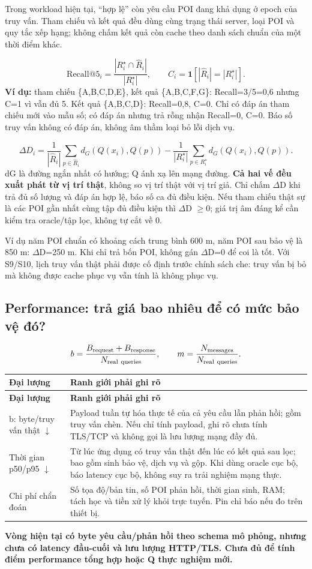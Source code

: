 \documentclass[10pt,a4paper]{article}
\newcommand{\key}[1]{\par\smallskip\noindent\colorbox{pale}{\parbox{\dimexpr\linewidth-2\fboxsep}{\textbf{#1}}}\par\smallskip}
\begin{document}
Trong workload hiện tại, “hợp lệ” còn yêu cầu POI đang khả dụng ở epoch của truy vấn. Tham chiếu và kết quả đều dùng cùng trạng thái server, loại POI và quy tắc xếp hạng; không chấm kết quả còn cache theo danh sách chuẩn của một thời điểm khác.

\[
\mathrm{Recall@5}_i=\frac{|R_i^\star\cap\widehat R_i|}{|R_i^\star|},\qquad C_i=\mathbf1[|\widehat R_i|=|R_i^\star|].
\]
\textbf{Ví dụ:} tham chiếu \{A,B,C,D,E\}, kết quả \{A,B,C,F,G\}: Recall=3/5=0,6 nhưng C=1 vì vẫn đủ 5. Kết quả \{A,B,C,D\}: Recall=0,8, C=0. Chỉ có đáp án tham chiếu mới vào mẫu số; có đáp án nhưng trả rỗng nhận Recall=0, C=0. Báo số truy vấn không có đáp án, không âm thầm loại bỏ lỗi dịch vụ.

\[
\Delta D_i=\frac{1}{|\widehat R_i|}\sum_{p\in\widehat R_i}d_G(Q(x_i),Q(p))-\frac{1}{|R_i^\star|}\sum_{p\in R_i^\star}d_G(Q(x_i),Q(p)).
\]
dG là đường ngắn nhất có hướng; Q ánh xạ lên mạng đường. \textbf{Cả hai vế đều xuất phát từ vị trí thật}, không so vị trí thật với vị trí giả. Chỉ chấm $\Delta$D khi trả đủ số lượng và đáp án hợp lệ, báo số ca đủ điều kiện. Nếu tham chiếu thật sự là các POI gần nhất cùng tập đủ điều kiện thì $\Delta$D $\ge$0; giá trị âm đáng kể cần kiểm tra oracle/tập lọc, không tự cắt về 0.

Ví dụ năm POI chuẩn có khoảng cách trung bình 600 m, năm POI sau bảo vệ là 850 m: $\Delta$D=250 m. Khi chỉ trả bốn POI, không gán $\Delta$D=0 để coi là tốt. Với S9/S10, lịch truy vấn thật phải được cố định trước chính sách che: truy vấn bị bỏ mà không được cache phục vụ vẫn tính là không phục vụ.

\subsection{Performance: trả giá bao nhiêu để có mức bảo vệ đó?}
\[
b=\frac{B_{\rm request}+B_{\rm response}}{N_{\rm real\ queries}},\qquad m=\frac{N_{\rm messages}}{N_{\rm real\ queries}}.
\]
\begingroup\small
\begin{longtable}{@{}P{4.305cm}P{12.614cm}@{}}
\toprule
\textbf{Đại lượng} & \textbf{Ranh giới phải ghi rõ}\\\midrule
\endfirsthead
\toprule
\textbf{Đại lượng} & \textbf{Ranh giới phải ghi rõ}\\\midrule
\endhead
\bottomrule\endfoot
b: byte/truy vấn thật $\downarrow$ & Payload tuần tự hóa thực tế của cả yêu cầu lẫn phản hồi; gồm truy vấn chèn. Nếu chỉ tính payload, ghi rõ chưa tính TLS/TCP và không gọi là lưu lượng mạng đầy đủ.\\
\addlinespace[3pt]
Thời gian p50/p95 $\downarrow$ & Từ lúc ứng dụng có truy vấn thật đến lúc có kết quả sau lọc; bao gồm sinh bảo vệ, dịch vụ và gộp. Khi dùng oracle cục bộ, báo latency cục bộ, không suy ra trải nghiệm mạng thực.\\
\addlinespace[3pt]
Chi phí chẩn đoán & Số tọa độ/bản tin, số POI phản hồi, thời gian sinh, RAM; tách học và tiền xử lý khỏi trực tuyến. Pin chỉ báo nếu đo trên thiết bị.\\
\end{longtable}
\endgroup
\key{Vòng hiện tại có byte yêu cầu/phản hồi theo schema mô phỏng, nhưng chưa có latency đầu-cuối và lưu lượng HTTP/TLS. Chưa đủ để tính điểm performance tổng hợp hoặc Q thực nghiệm mới.}
\end{document}
